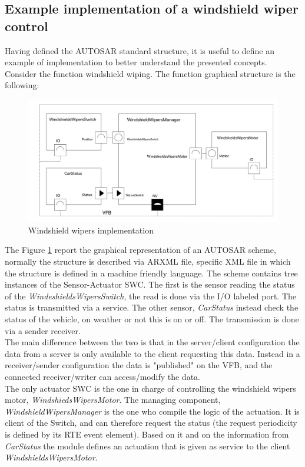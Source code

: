 \documentclass[../main.tex]{subfiles}
\begin{document}
\subsection{Example implementation of a windshield wiper control}
Having defined the \gls{AUTOSAR} standard structure, it is useful to define an example of implementation to better understand the presented concepts. Consider the function windshield wiping. The function graphical structure is the following:
\begin{figure}[H]
    \centering
    \includegraphics[width=\linewidth]{images_folder/windshield_WIpers_aUtosar.jpeg}
    \caption{Windshield wipers implementation}
    \label{fig:WINWIP}
\end{figure}
The Figure   \ref{fig:WINWIP} report the graphical representation of an \gls{AUTOSAR} scheme, normally the structure is described via ARXML file, specific XML file in which the structure is defined in a machine friendly language. 
The scheme contains tree instances of the Sensor-Actuator \gls{SWC}. The first is the sensor reading the status of the \textit{WindeshieldsWipersSwitch}, the read is done via the \gls{I/O} labeled port. The status is transmitted via a service. The other sensor, \textit{CarStatus} instead check the status of the vehicle, on weather or not this is on or off. The transmission is done via a sender receiver.\\
The main difference between the two is that in the server/client configuration the data from a server is only available to the client requesting this data. Instead in a receiver/sender configuration the data is "published" on the \gls{VFB}, and the connected receiver/writer can access/modify the data.\\
The only actuator \gls{SWC} is the one in charge of controlling the windshield wipers motor, \textit{WindshiedsWipersMotor}. The managing component, \textit{WindshieldWipersManager} is the one who compile the logic of the actuation. It is client of the Switch, and can therefore request the status (the request periodicity is defined by its RTE event element). Based on it and on the information from \textit{CarStatus} the module defines an actuation that is given as service to the client \textit{WindshieldsWipersMotor}.\\
\end{document}
